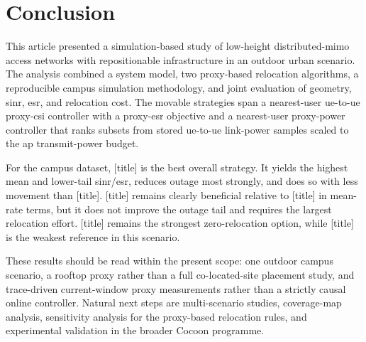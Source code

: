 \section{Conclusion}

This article presented a simulation-based study of low-height distributed-\gls{mimo} access networks with repositionable infrastructure in an outdoor urban scenario. The analysis combined a system model, two proxy-based relocation algorithms, a reproducible campus simulation methodology, and joint evaluation of geometry, \gls{sinr}, \gls{esr}, and relocation cost. The movable strategies span a nearest-user \gls{ue}-to-\gls{ue} proxy-\gls{csi} controller with a proxy-\gls{esr} objective and a nearest-user proxy-power controller that ranks subsets from stored \gls{ue}-to-\gls{ue} link-power samples scaled to the \gls{ap} transmit-power budget.

For the campus dataset, [title] is the best overall strategy. It yields the highest mean and lower-tail \gls{sinr}/\gls{esr}, reduces outage most strongly, and does so with less movement than [title]. [title] remains clearly beneficial relative to [title] in mean-rate terms, but it does not improve the outage tail and requires the largest relocation effort. [title] remains the strongest zero-relocation option, while [title] is the weakest reference in this scenario.

These results should be read within the present scope: one outdoor campus scenario, a rooftop proxy rather than a full co-located-site placement study, and trace-driven current-window proxy measurements rather than a strictly causal online controller. Natural next steps are multi-scenario studies, coverage-map analysis, sensitivity analysis for the proxy-based relocation rules, and experimental validation in the broader Cocoon programme.

